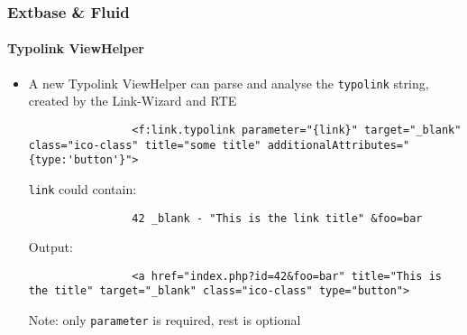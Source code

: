 
\begin{frame}[fragile]
	\frametitle{Extbase \& Fluid}
	\framesubtitle{Typolink ViewHelper}

	\lstset{
		basicstyle=\tiny\ttfamily
	}

	\begin{itemize}
		\item A new Typolink ViewHelper can parse and analyse the \texttt{typolink} string, created by the Link-Wizard and RTE

			\begin{lstlisting}
				<f:link.typolink parameter="{link}" target="_blank" class="ico-class" title="some title" additionalAttributes="{type:'button'}">
			\end{lstlisting}

			\texttt{link} could contain:
			\begin{lstlisting}
				42 _blank - "This is the link title" &foo=bar
			\end{lstlisting}

			Output:
			\begin{lstlisting}
				<a href="index.php?id=42&foo=bar" title="This is the title" target="_blank" class="ico-class" type="button">
			\end{lstlisting}

			Note: only \texttt{parameter} is required, rest is optional

	\end{itemize}

\end{frame}



